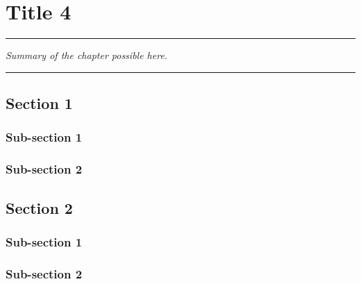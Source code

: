 
\lhead[\fancyplain{}{\leftmark}]%
      {\fancyplain{}{}} %
\chead[\fancyplain{}{}]%
      {\fancyplain{}{}}
\rhead[\fancyplain{}{}]%
      {\fancyplain{}{\rightmark}}%
\lfoot[\fancyplain{}{}]%
      {\fancyplain{}{}}
\cfoot[\fancyplain{}{\thepage}]%
      {\fancyplain{}{\thepage}} %
\rfoot[\fancyplain{}{}]%
     {\fancyplain{}{\scriptsize}}




\chapter{Title 4}
\label{ch:4}


\begin{center}
\rule{0.7\linewidth}{.5pt}
\begin{minipage}{0.7\linewidth}
\smallskip

\textit{Summary of the chapter possible here. 
}

\end{minipage}
\smallskip
\rule{0.7\linewidth}{.5pt}
\end{center}

\minitoc
\newpage


\section{Section 1}
\subsection{Sub-section 1}
\blindtext

\subsection{Sub-section 2}
\blindtext





\section{Section 2}
\subsection{Sub-section 1}
\blindtext

\subsection{Sub-section 2}
\blindtext